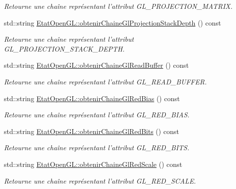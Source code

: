\begin{DoxyCompactItemize}
\begin{DoxyCompactList}\small\item\em Retourne une chaîne représentant l'attribut G\-L\-\_\-\-P\-R\-O\-J\-E\-C\-T\-I\-O\-N\-\_\-\-M\-A\-T\-R\-I\-X. \end{DoxyCompactList}\item 
std\-::string \hyperlink{group__utilitaire_gad2d5e19c001663ff2943c43cc9b0c0ea}{Etat\-Open\-G\-L\-::obtenir\-Chaine\-Gl\-Projection\-Stack\-Depth} () const 
\begin{DoxyCompactList}\small\item\em Retourne une chaîne représentant l'attribut G\-L\-\_\-\-P\-R\-O\-J\-E\-C\-T\-I\-O\-N\-\_\-\-S\-T\-A\-C\-K\-\_\-\-D\-E\-P\-T\-H. \end{DoxyCompactList}\item 
std\-::string \hyperlink{group__utilitaire_ga5d3a759c6f7b623d7598708ca4810b00}{Etat\-Open\-G\-L\-::obtenir\-Chaine\-Gl\-Read\-Buffer} () const 
\begin{DoxyCompactList}\small\item\em Retourne une chaîne représentant l'attribut G\-L\-\_\-\-R\-E\-A\-D\-\_\-\-B\-U\-F\-F\-E\-R. \end{DoxyCompactList}\item 
std\-::string \hyperlink{group__utilitaire_ga4db73eaaf942ff5c5aa9b62e0386f9a9}{Etat\-Open\-G\-L\-::obtenir\-Chaine\-Gl\-Red\-Bias} () const 
\begin{DoxyCompactList}\small\item\em Retourne une chaîne représentant l'attribut G\-L\-\_\-\-R\-E\-D\-\_\-\-B\-I\-A\-S. \end{DoxyCompactList}\item 
std\-::string \hyperlink{group__utilitaire_gac4060a4139d031b9f8b9b1198c4a89f5}{Etat\-Open\-G\-L\-::obtenir\-Chaine\-Gl\-Red\-Bits} () const 
\begin{DoxyCompactList}\small\item\em Retourne une chaîne représentant l'attribut G\-L\-\_\-\-R\-E\-D\-\_\-\-B\-I\-T\-S. \end{DoxyCompactList}\item 
std\-::string \hyperlink{group__utilitaire_gae20713f3668cb6be662849b8de30d623}{Etat\-Open\-G\-L\-::obtenir\-Chaine\-Gl\-Red\-Scale} () const 
\begin{DoxyCompactList}\small\item\em Retourne une chaîne représentant l'attribut G\-L\-\_\-\-R\-E\-D\-\_\-\-S\-C\-A\-L\-E. \end{DoxyCompactList}\item 

\end{DoxyCompactItemize}
